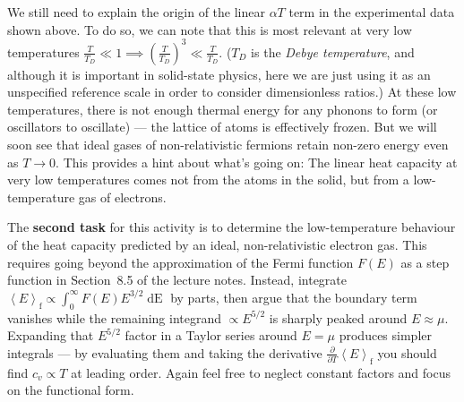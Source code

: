 \documentclass[12 pt]{article} %
\newcommand{\al}{\ensuremath{\alpha} }
\newcommand{\vev}[1]{\ensuremath{\left\langle #1 \right\rangle} }
\newcommand{\pderiv}[2]{\ensuremath{\frac{\partial #1}{\partial #2}} }
\renewcommand{\d}[1]{\ensuremath{\mathop{d#1}} }
\begin{document}
We still need to explain the origin of the linear $\al T$ term in the experimental data shown above.
To do so, we can note that this is most relevant at very low temperatures $\frac{T}{T_D} \ll 1 \implies \left(\frac{T}{T_D}\right)^3 \ll \frac{T}{T_D}$.
($T_D$ is the \textit{Debye temperature}, and although it is important in solid-state physics, here we are just using it as an unspecified reference scale in order to consider dimensionless ratios.)
At these low temperatures, there is not enough thermal energy for any phonons to form (or oscillators to oscillate) --- the lattice of atoms is effectively frozen.
But we will soon see that ideal gases of non-relativistic fermions retain non-zero energy even as $T \to 0$.
This provides a hint about what's going on: The linear heat capacity at very low temperatures comes not from the atoms in the solid, but from a low-temperature gas of electrons.

The \textbf{second task} for this activity is to determine the low-temperature behaviour of the heat capacity predicted by an ideal, non-relativistic electron gas.
This requires going beyond the approximation of the Fermi function $F(E)$ as a step function in Section~8.5 of the lecture notes.
Instead, integrate $\vev{E}_{\text{f}} \propto \int_0^{\infty} F(E) E^{3 / 2} \d{E}$ by parts, then argue that the boundary term vanishes while the remaining integrand $\propto E^{5 / 2}$ is sharply peaked around $E \approx \mu$.
Expanding that $E^{5 / 2}$ factor in a Taylor series around $E = \mu$ produces simpler integrals --- by evaluating them and taking the derivative $\pderiv{}{T}\vev{E}_{\text{f}}$ you should find $c_v \propto T$ at leading order.
Again feel free to neglect constant factors and focus on the functional form.
\end{document}
